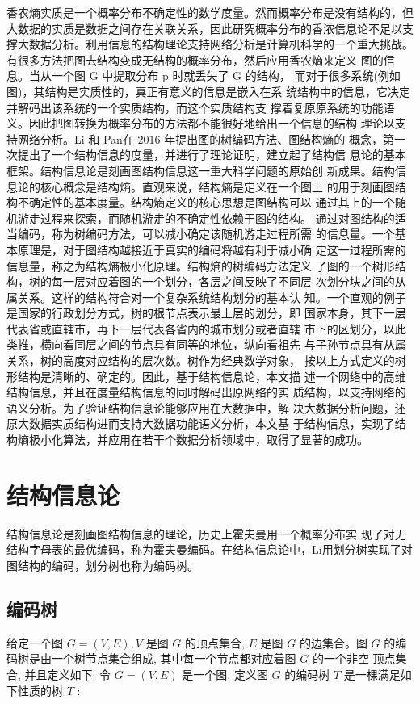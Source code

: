 \documentclass[a4paper]{apa6}
\begin{document}
香农熵实质是一个概率分布不确定性的数学度量。然而概率分布是没有结构的，但大数据的实质是数据之间存在关联关系，因此研究概率分布的香浓信息论不足以支撑大数据分析。利用信息的结构理论支持网络分析是计算机科学的一个重大挑战。有很多方法把图去结构变成无结构的概率分布，然后应用香农熵来定义 图的信息。当从一个图 G 中提取分布 p 时就丢失了 G 的结构， 而对于很多系统(例如图)，其结构是实质性的，真正有意义的信息是嵌入在系 统结构中的信息，它决定并解码出该系统的一个实质结构，而这个实质结构支 撑着复原原系统的功能语义。因此把图转换为概率分布的方法都不能很好地给出一个信息的结构 理论以支持网络分析。Li 和 Pan\citep{li_structural_2016}在 2016 年提出图的树编码方法、图结构熵的 概念，第一次提出了一个结构信息的度量，并进行了理论证明，建立起了结构信 息论的基本框架。结构信息论\citep{li_structural_2016}是刻画图结构信息这一重大科学问题的原始创 新成果。结构信息论的核心概念是结构熵。直观来说，结构熵是定义在一个图上 的用于刻画图结构不确定性的基本度量。结构熵定义的核心思想是图结构可以 通过其上的一个随机游走过程来探索，而随机游走的不确定性依赖于图的结构。 通过对图结构的适当编码，称为树编码方法，可以减小确定该随机游走过程所需 的信息量。一个基本原理是，对于图结构越接近于真实的编码将越有利于减小确 定这一过程所需的信息量，称之为结构熵极小化原理。结构熵的树编码方法定义 了图的一个树形结构，树的每一层对应着图的一个划分，各层之间反映了不同层 次划分块之间的从属关系。这样的结构符合对一个复杂系统结构划分的基本认 知。一个直观的例子是国家的行政划分方式，树的根节点表示最上层的划分，即 国家本身，其下一层代表省或直辖市，再下一层代表各省内的城市划分或者直辖 市下的区划分，以此类推，横向看同层之间的节点具有同等的地位，纵向看祖先 与子孙节点具有从属关系，树的高度对应结构的层次数。树作为经典数学对象， 按以上方式定义的树形结构是清晰的、确定的。因此，基于结构信息论，本文描 述一个网络中的高维结构信息，并且在度量结构信息的同时解码出原网络的实 质结构，以支持网络的语义分析。为了验证结构信息论能够应用在大数据中，解 决大数据分析问题，还原大数据实质结构进而支持大数据功能语义分析，本文基 于结构信息，实现了结构熵极小化算法，并应用在若干个数据分析领域中，取得了显著的成功。

\section{结构信息论}
\label{sec:org716b891}
结构信息论\citep{li_structural_2016}是刻画图结构信息的理论，历史上霍夫曼用一个概率分布实 现了对无结构字母表的最优编码，称为霍夫曼编码。在结构信息论中，Li\citep{li_structural_2016}用划分树实现了对图结构的编码，划分树也称为编码树。

\subsection{编码树}
\label{sec:org7de0248}
给定一个图 \(G=(V, E), V\) 是图 \(G\) 的顶点集合, \(E\) 是图 \(G\) 的边集合。图 \(G\) 的编码树是由一个树节点集合组成, 其中每一个节点都对应着图 \(G\) 的一个非空 顶点集合, 并且定义如下:
令 \(G=(V, E)\) 是一个图, 定义图 \(G\) 的编码树 \(T\) 是一棵满足如下性质的树 \(T\) :
\end{document}
